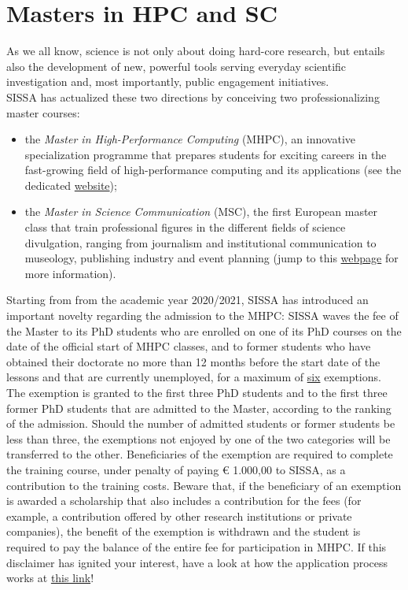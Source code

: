 \documentclass{sissavademecum}
\begin{document}
\section{Masters in HPC and SC}

As we all know, science is not only about doing hard-core research, but entails also the development of new, powerful tools serving everyday scientific investigation and, most importantly, public engagement initiatives. \\
SISSA has actualized these two directions by conceiving two professionalizing master courses:
\begin{itemize}
    \item the \textit{Master in High-Performance Computing} (MHPC), an innovative specialization programme that prepares students for exciting careers in the fast-growing field of high-performance computing and its applications (see the dedicated \href{https://www.mhpc.it/}{website});
    \item the \textit{Master in Science Communication} (MSC), the first European master class that train professional figures in the different fields of science divulgation, ranging from journalism and institutional communication to museology, publishing industry and event planning (jump to this \href{https://mcs.sissa.it/}{webpage} for more information).
\end{itemize}
Starting from from the academic year 2020/2021, SISSA has introduced an important novelty regarding the admission to the MHPC: SISSA waves the fee of the Master to its PhD students who are enrolled on one of its PhD courses on the date of the official start of MHPC classes, and to former students who have obtained their doctorate no more than 12 months before the start date of the lessons and that are currently unemployed, for a maximum of \underline{six} exemptions. The exemption is granted to the first three PhD students and to the first three former PhD students that are admitted to the Master, according to the ranking of the admission. Should the number of admitted students or former students be less than three, the exemptions not enjoyed by one of the two categories will be transferred to the other. Beneficiaries of the exemption are required to complete the training course, under penalty of paying € 1.000,00 to SISSA, as a contribution to the training costs. Beware that, if the beneficiary of an exemption is awarded a scholarship that also includes a contribution for the fees (for example, a contribution offered by other research institutions or private companies), the benefit of the exemption is withdrawn and the student is required to pay the balance of the entire fee for participation in MHPC. If this disclaimer has ignited your interest, have a look at how the application process works at \href{https://www.mhpc.it/how-apply}{this link}!
\end{document}

